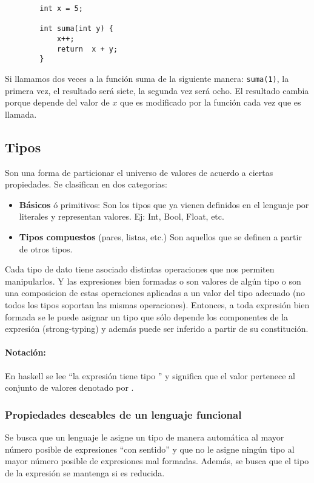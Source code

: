 \begin{centrado}
	\begin{verbatim}
		int x = 5;
		
		int suma(int y) {
			x++;
			return  x + y;
		}
	\end{verbatim}
\end{centrado}

Si llamamos dos veces a la función suma de la siguiente manera: \texttt{suma(1)}, la primera vez, el resultado será siete, la segunda vez será ocho. El resultado cambia porque depende del valor de $x$ que es modificado por la función cada vez que es llamada.

\subsection{Tipos}
Son una forma de particionar el universo de valores de acuerdo a ciertas propiedades. Se clasifican en dos categorias:
\begin{itemize}
	\item \textbf{Básicos} ó primitivos: Son los tipos que ya vienen definidos en el lenguaje por literales y representan valores. Ej: Int, Bool, Float, etc.
	\item \textbf{Tipos compuestos} (pares, listas, etc.) Son aquellos que se definen a partir de otros tipos.
\end{itemize}

Cada tipo de dato tiene asociado distintas operaciones que nos permiten manipularlos. Y las expresiones bien formadas o son valores de algún tipo o son una composicion de estas operaciones aplicadas a un valor del tipo adecuado (no todos los tipos soportan las mismas operaciones). Entonces, a toda expresión bien formada se le puede asignar un tipo que sólo depende los componentes de la expresión (strong-typing) y además puede ser inferido a partir de su constitución.

\paragraph{Notación:}   En haskell  se lee “la expresión  tiene tipo ” y significa que el valor  pertenece al conjunto de valores denotado por .

\subsubsection{Propiedades deseables de un lenguaje funcional}
Se busca que un lenguaje le asigne un tipo de manera automática al mayor número posible de expresiones ``con sentido'' y que no le asigne ningún tipo al mayor número posible de expresiones mal formadas. Además, se busca que el tipo de la expresión se mantenga si es reducida.

